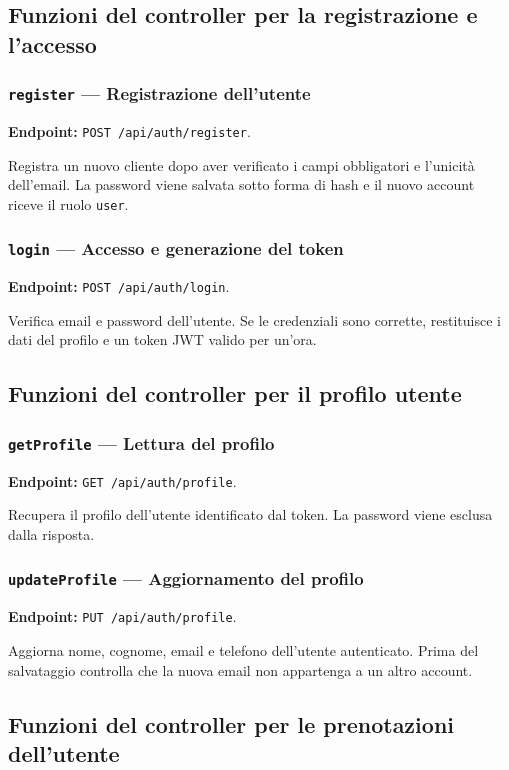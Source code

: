 \documentclass[12pt,a4paper]{article}
\begin{document}
\subsection{Funzioni del controller per la registrazione e l'accesso}

\subsubsection{\texttt{register} --- Registrazione dell'utente}
\textbf{Endpoint:} \texttt{POST /api/auth/register}.

Registra un nuovo cliente dopo aver verificato i campi obbligatori e
l'unicità dell'email. La password viene salvata sotto forma di hash e il nuovo
account riceve il ruolo \texttt{user}.

\subsubsection{\texttt{login} --- Accesso e generazione del token}
\textbf{Endpoint:} \texttt{POST /api/auth/login}.

Verifica email e password dell'utente. Se le credenziali sono corrette,
restituisce i dati del profilo e un token JWT valido per un'ora.

\subsection{Funzioni del controller per il profilo utente}

\subsubsection{\texttt{getProfile} --- Lettura del profilo}
\textbf{Endpoint:} \texttt{GET /api/auth/profile}.

Recupera il profilo dell'utente identificato dal token. La password viene
esclusa dalla risposta.

\subsubsection{\texttt{updateProfile} --- Aggiornamento del profilo}
\textbf{Endpoint:} \texttt{PUT /api/auth/profile}.

Aggiorna nome, cognome, email e telefono dell'utente autenticato. Prima del
salvataggio controlla che la nuova email non appartenga a un altro account.

\subsection{Funzioni del controller per le prenotazioni dell'utente}
\end{document}
